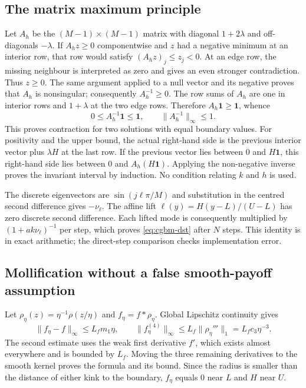 \documentclass[11pt]{article}
\begin{document}
\subsection{The matrix maximum principle}

Let $A_h$ be the $(M-1)\times(M-1)$ matrix with diagonal
$1+2\lambda$ and off-diagonals $-\lambda$. If $A_h z\geq0$ componentwise
and $z$ had a negative minimum at an interior row, that row would satisfy
$(A_hz)_j\leq z_j<0$. At an edge row, the missing neighbour is interpreted
as zero and gives an even stronger contradiction. Thus $z\geq0$.
The same argument applied to a null vector and its negative proves that
$A_h$ is nonsingular; consequently $A_h^{-1}\geq0$. The row sums of
$A_h$ are one in interior rows and $1+\lambda$ at the two edge rows.
Therefore $A_h\mathbf 1\geq\mathbf 1$, whence
\begin{equation}
 0\leq A_h^{-1}\mathbf 1\leq\mathbf 1,
 \qquad \|A_h^{-1}\|_\infty\leq1.
 \label{eq:cgbm-mmatrix}
\end{equation}
This proves contraction for two solutions with equal boundary values.
For positivity and the upper bound, the actual right-hand side is the
previous interior vector plus $\lambda H$ at the last row. If the previous
vector lies between $0$ and $H\mathbf 1$, this right-hand side lies between
$0$ and $A_h(H\mathbf 1)$. Applying the non-negative inverse proves the
invariant interval by induction. No condition relating $k$ and $h$ is used.

The discrete eigenvectors are $\sin(j\ell\pi/M)$ and substitution in the
centred second difference gives $-\nu_\ell$. The affine lift
$\ell(y)=H(y-L)/(U-L)$ has zero discrete second difference. Each lifted
mode is consequently multiplied by $(1+ak\nu_\ell)^{-1}$ per step,
which proves \eqref{eq:cgbm-dst} after $N$ steps. This identity is in exact
arithmetic; the direct-step comparison checks implementation error.

\subsection{Mollification without a false smooth-payoff assumption}

Let $\rho_\eta(z)=\eta^{-1}\rho(z/\eta)$ and
$f_\eta=f*\rho_\eta$. Global Lipschitz continuity gives
\begin{equation}
 \|f_\eta-f\|_\infty\leq L_fm_1\eta,
 \qquad
 \|f_\eta^{(4)}\|_\infty
 \leq L_f\|\rho_\eta'''\|_1=L_f c_3\eta^{-3}.
 \label{eq:cgbm-mollifier-bounds}
\end{equation}
The second estimate uses the weak first derivative $f'$, which exists
almost everywhere and is bounded by $L_f$. Moving the three remaining
derivatives to the smooth kernel proves the formula and its bound.
Since the radius is smaller than the distance of either kink to the
boundary, $f_\eta$ equals $0$ near $L$ and $H$ near $U$.
\end{document}
